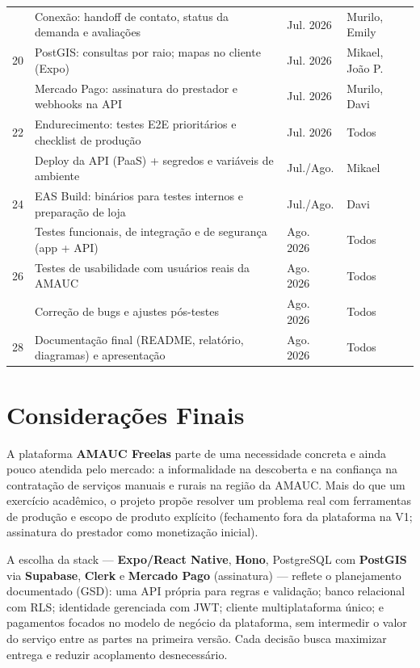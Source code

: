 \documentclass[12pt, a4paper]{article}
\begin{document}
\begin{longtable}{%
  >{\centering\arraybackslash}p{0.7cm}
  p{7.2cm}
  p{3.4cm}
  >{\centering\arraybackslash}p{1.4cm}}
  19 & Conexão: handoff de contato, status da demanda e avaliações
     & Jul. 2026 & Murilo, Emily \\
  \rowcolor{rowGray}
  20 & PostGIS: consultas por raio; mapas no cliente (Expo)
     & Jul. 2026 & Mikael, João P. \\
  21 & Mercado Pago: assinatura do prestador e webhooks na API
     & Jul. 2026 & Murilo, Davi \\
  \rowcolor{rowGray}
  22 & Endurecimento: testes E2E prioritários e checklist de produção
     & Jul. 2026 & Todos \\
  23 & Deploy da API (PaaS) + segredos e variáveis de ambiente
     & Jul./Ago. & Mikael \\
  \rowcolor{rowGray}
  24 & EAS Build: binários para testes internos e preparação de loja
     & Jul./Ago. & Davi \\
  25 & Testes funcionais, de integração e de segurança (app + API)
     & Ago. 2026 & Todos \\
  \rowcolor{rowGray}
  26 & Testes de usabilidade com usuários reais da AMAUC
     & Ago. 2026 & Todos \\
  27 & Correção de bugs e ajustes pós-testes
     & Ago. 2026 & Todos \\
  \rowcolor{rowGray}
  28 & Documentação final (README, relatório, diagramas) e apresentação
     & Ago. 2026 & Todos \\
\end{longtable}

\newpage
\section{Considerações Finais}

A plataforma \textbf{AMAUC Freelas} parte de uma necessidade concreta e
ainda pouco atendida pelo mercado: a informalidade na descoberta e na
confiança na contratação de serviços manuais e rurais na região da AMAUC.
Mais do que um exercício acadêmico, o projeto propõe resolver um problema
real com ferramentas de produção e escopo de produto explícito (fechamento
fora da plataforma na V1; assinatura do prestador como monetização inicial).

A escolha da stack --- \textbf{Expo/React Native}, \textbf{Hono}, PostgreSQL
com \textbf{PostGIS} via \textbf{Supabase}, \textbf{Clerk} e
\textbf{Mercado Pago} (assinatura) --- reflete o planejamento documentado
(GSD): uma API própria para regras e validação; banco relacional com RLS;
identidade gerenciada com JWT; cliente multiplataforma único; e pagamentos
focados no modelo de negócio da plataforma, sem intermedir o valor do
serviço entre as partes na primeira versão. Cada decisão busca maximizar
entrega e reduzir acoplamento desnecessário.
\end{document}
